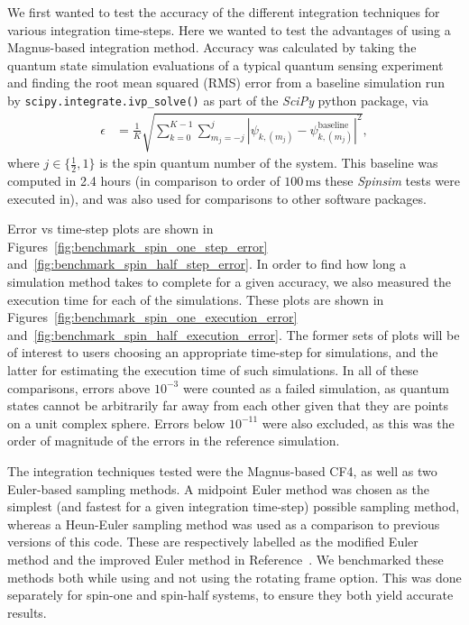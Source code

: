\documentclass{jors}
\begin{document}
		We first wanted to test the accuracy of the different integration techniques for various integration time-steps.
		Here we wanted to test the advantages of using a Magnus-based integration method.
		Accuracy was calculated by taking the quantum state simulation evaluations of a typical quantum sensing experiment and finding the root mean squared (RMS) error from a baseline simulation run by \texttt{scipy.integrate.ivp\_solve()} as part of the \emph{SciPy} python package, via
		\begin{align}
			\epsilon &= \frac{1}{K}\sqrt{\sum_{k = 0}^{K - 1}\sum_{m_j = -j}^j|\psi_{k, (m_j)} - \psi_{k, (m_j)}^{\textrm{baseline}}|^2},\label{eq:error}
		\end{align}
		where $ j \in \{\frac12, 1\} $ is the spin quantum number of the system.
		This baseline was computed in 2.4 hours (in comparison to order of $ 100\,\text{ms} $ these \emph{Spinsim} tests were executed in), and was also used for comparisons to other software packages.

		Error vs time-step plots are shown in Figures~\ref{fig:benchmark_spin_one_step_error} and~\ref{fig:benchmark_spin_half_step_error}.
		In order to find how long a simulation method takes to complete for a given accuracy, we also measured the execution time for each of the simulations.
		These plots are shown in Figures~\ref{fig:benchmark_spin_one_execution_error} and~\ref{fig:benchmark_spin_half_execution_error}.
		The former sets of plots will be of interest to users choosing an appropriate time-step for simulations, and the latter for estimating the execution time of such simulations.
		In all of these comparisons, errors above $ 10^{-3} $ were counted as a failed simulation, as quantum states cannot be arbitrarily far away from each other given that they are points on a unit complex sphere.
		Errors below $ 10^{-11} $ were also excluded, as this was the order of magnitude of the errors in the reference simulation.

		The integration techniques tested were the Magnus-based CF4, as well as two Euler-based sampling methods.
		A midpoint Euler method was chosen as the simplest (and fastest for a given integration time-step) possible sampling method, whereas a Heun-Euler sampling method was used as a comparison to previous versions of this code.
		These are respectively labelled as the modified Euler method and the improved Euler method in Reference~\cite[p328]{suli_introduction_2003}.
		We benchmarked these methods both while using and not using the rotating frame option.
		This was done separately for spin-one and spin-half systems, to ensure they both yield accurate results.
\end{document}
